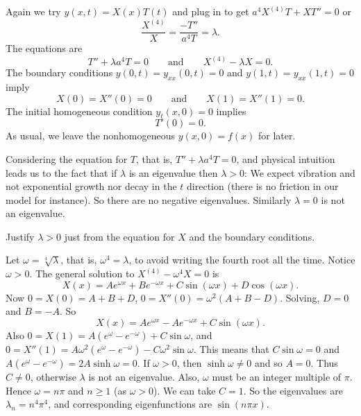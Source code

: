 Again we try $y(x,t) = X(x)T(t)$ and plug in to get
$a^4 X^{(4)}T + XT'' = 0$ or 
\begin{equation*}
\frac{X^{(4)}}{X} = \frac{- T''}{a^4T} = \lambda .
\end{equation*}
The equations are
\begin{equation*}
T'' + \lambda a^4 T = 0
\qquad \text{and} \qquad
X^{(4)} - \lambda X = 0 .
\end{equation*}
The boundary conditions
$y(0,t) = y_{xx}(0,t) = 0$ and $y(1,t) = y_{xx}(1,t) = 0$ imply
\begin{equation*}
X(0) =  X''(0) = 0
\qquad \text{and} \qquad
X(1) =  X''(1) = 0 .
\end{equation*}
The initial homogeneous condition $y_t(x,0) = 0$ implies
\begin{equation*}
T'(0) = 0 .
\end{equation*}
As usual, we leave the nonhomogeneous $y(x,0) = f(x)$ for later.

Considering the equation for $T$, that is,
$T'' + \lambda a^4 T = 0$, and physical intuition leads us
to the fact that if $\lambda$ is an eigenvalue then $\lambda > 0$:
We expect vibration and not exponential growth nor
decay in the $t$ direction (there is no friction in our model for instance).
So there are no negative eigenvalues.
Similarly $\lambda = 0$ is not an eigenvalue.

\begin{exercise}
Justify $\lambda > 0$ just from the equation for $X$ and the boundary
conditions.
\end{exercise}

Let $\omega = \sqrt[4]{\lambda}$, that is, $\omega^4 = \lambda$,
to avoid writing the fourth root
all the time.  Notice $\omega > 0$.
The general solution to
$X^{(4)} - \omega^4 X = 0$ is
\begin{equation*}
X(x) = A e^{\omega x} + B e^{-\omega x} + C \sin (\omega x) +
D \cos (\omega x) .
\end{equation*}
Now $0 = X(0) = A+B+D$, $0 = X''(0) = \omega^2 (A + B - D)$.
Solving,
$D = 0$ and $B = -A$.
So
\begin{equation*}
X(x) = A e^{\omega x} - A e^{-\omega x} + C \sin (\omega x) .
\end{equation*}
Also $0 = X(1) = A (e^{\omega} - e^{-\omega}) + C \sin \omega$, and
$0 = X''(1) = A \omega^2 (e^{\omega} - e^{-\omega}) - C \omega^2 \sin \omega$.
This means that $C \sin \omega  = 0$ and 
$A (e^{\omega} - e^{-\omega}) = 2 A \sinh \omega = 0$.  If $\omega > 0$, then
$\sinh \omega \not= 0$ and so $A = 0$.  Thus $C \not=0$, otherwise
$\lambda$ is not an
eigenvalue.  Also, $\omega$ must be an integer multiple of
$\pi$.  Hence $\omega = n \pi$ and $n \geq 1$ (as $\omega > 0$).  We can take
$C=1$.  So the eigenvalues are $\lambda_n = n^4 \pi^4$, and corresponding eigenfunctions
are $\sin (n \pi x)$.

